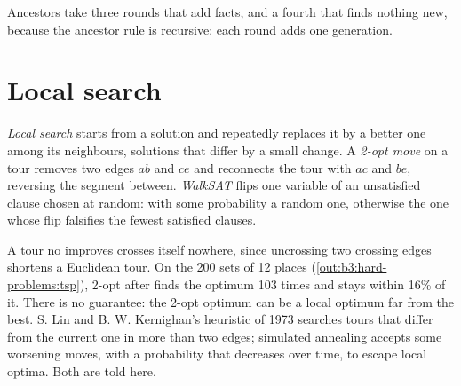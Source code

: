 \label{out:b3:hard-problems:horn}

Ancestors take three rounds that add facts, and a fourth that finds nothing new, because the ancestor rule is recursive: each round adds one generation.

\section{Local search}\label{sec:b3:hard-problems:local}

\begin{definition}\label{def:b3:hard-problems:local-search}
\emph{Local search} starts from a solution and repeatedly replaces it by a better one among its neighbours, solutions that differ by a small change. A \emph{2-opt move} on a tour removes two edges $ab$ and $ce$ and reconnects the tour with $ac$ and $be$, reversing the segment between. \emph{WalkSAT} flips one variable of an unsatisfied clause chosen at random: with some probability a random one, otherwise the one whose flip falsifies the fewest satisfied clauses.
\end{definition}

\label{lst:b3:hard-problems:two-opt}

A tour no  improves crosses itself nowhere, since uncrossing two crossing edges shortens a Euclidean tour. On the 200 sets of 12 places (\cref{out:b3:hard-problems:tsp}), 2-opt after  finds the optimum 103 times and stays within 16\% of it. There is no guarantee: the 2-opt optimum can be a local optimum far from the best. S. Lin and B. W. Kernighan's heuristic of 1973 searches tours that differ from the current one in more than two edges; simulated annealing accepts some worsening moves, with a probability that decreases over time, to escape local optima. Both are told here. %

\label{lst:b3:hard-problems:walksat}


